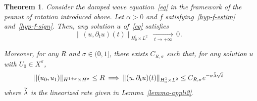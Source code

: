 \documentclass[10pt]{amsart}
\newtheorem{theo}{Theorem}[section]
\theoremstyle{definition}\newtheorem{defi}[theo]{Definition}\newtheorem{rema}[theo]{Remark}\newtheorem{exam}[theo]{Example}\newtheorem{exem}[theo]{Example}\newtheorem{nota}[theo]{Notation}
\let\oldtilde\tilde
\renewcommand*{\tilde}[1]{\mathchoice{\widetilde{#1}}{\widetilde{#1}}{\oldtilde{#1}}{\oldtilde{#1}}}\let\oldexists\exists
\renewcommand*{\exists}{\mathrel{\oldexists}}
\begin{document}
\begin{theo}\label{th-appli2}
Consider the damped wave equation~\eqref{eq} in the framework of the peanut of rotation introduced above. Let $\alpha>0$ and $f$ satisfying~\eqref{hyp-f-estim} and~\eqref{hyp-f-sign}. Then, any solution $u$ of~\eqref{eq} satisfies
\[
\|(u,\partial_t u)(t)\|_{H^1_0\times L^2}\,\xrightarrow[\:t\longrightarrow
+\infty\:]{}\,0\,.
\]

Moreover, for any $R$ and $\sigma\in (0,1]$, there exists $C_{R,\sigma}$ such that, for any solution $u$ with $U_0\in X^\sigma$,
\[
\|(u_0,u_1)\|_{H^{1+\sigma}\times H^\sigma}\leq
R\:\Longrightarrow\:\|(u,\partial_t u)(t)\|_{H^1_0\times L^2} \leq
C_{R,\sigma}e^{-\sigma\tilde \lambda\sqrt{t}}
\]
where $\tilde\lambda$ is the linearized rate given in Lemma~\ref{lemma-appli2}.
\end{theo}
\end{document}

